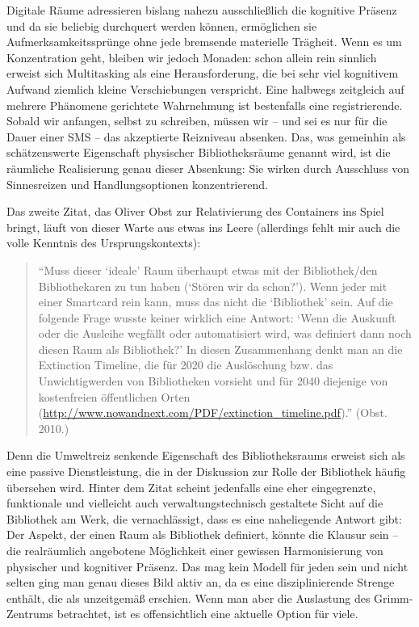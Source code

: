 \documentclass[output=paper]{langscibook}
\begin{document}
Digitale Räume adressieren bislang nahezu ausschließlich die kognitive
Präsenz und da sie beliebig durchquert werden können, ermöglichen sie
Aufmerksamkeitssprünge ohne jede bremsende materielle Trägheit. Wenn es
um Konzentration geht, bleiben wir jedoch Monaden: schon allein rein
sinnlich erweist sich Multitasking als eine Herausforderung, die bei
sehr viel kognitivem Aufwand ziemlich kleine Verschiebungen verspricht.
Eine halbwegs zeitgleich auf mehrere Phänomene gerichtete Wahrnehmung
ist bestenfalls eine registrierende. Sobald wir anfangen, selbst zu
schreiben, müssen wir -- und sei es nur für die Dauer einer SMS -- das
akzeptierte Reizniveau absenken. Das, was gemeinhin als schätzenswerte
Eigenschaft physischer Bibliotheksräume genannt wird, ist die räumliche
Realisierung genau dieser Absenkung: Sie wirken durch Ausschluss von
Sinnesreizen und Handlungsoptionen konzentrierend.

Das zweite Zitat, das Oliver Obst zur Relativierung des Containers ins
Spiel bringt, läuft von dieser Warte aus etwas ins Leere (allerdings
fehlt mir auch die volle Kenntnis des Ursprungskontexts):

\begin{quote}
\enquote{Muss dieser \enquote{ideale} Raum überhaupt etwas mit der Bibliothek/den
Bibliothekaren zu tun haben (\enquote{Stören wir da schon?}). Wenn jeder
mit einer Smartcard rein kann, muss das nicht die \enquote{Bibliothek}
sein. Auf die folgende Frage wusste keiner wirklich eine Antwort:
\enquote{Wenn die Auskunft oder die Ausleihe wegfällt oder automatisiert
wird, was definiert dann noch diesen Raum als Bibliothek?} In diesen
Zusammenhang denkt man an die
Extinction
Timeline, die für 2020 die Auslöschung bzw. das Unwichtigwerden von
Bibliotheken vorsieht und für 2040 diejenige von kostenfreien
öffentlichen Orten (\url{http://www.nowandnext.com/PDF/extinction_timeline.pdf}).} (Obst. 2010.)
\end{quote}

Denn die Umweltreiz senkende Eigenschaft des Bibliotheksraums erweist
sich als eine passive Dienstleistung, die in der Diskussion zur Rolle
der Bibliothek häufig übersehen wird. Hinter dem Zitat scheint
jedenfalls eine eher eingegrenzte, funktionale und vielleicht auch
verwaltungstechnisch gestaltete Sicht auf die Bibliothek am Werk, die
vernachlässigt, dass es eine naheliegende Antwort gibt: Der Aspekt, der
einen Raum als Bibliothek definiert, könnte die Klausur sein -- die
realräumlich angebotene Möglichkeit einer gewissen Harmonisierung von
physischer und kognitiver Präsenz. Das mag kein Modell für jeden sein
und nicht selten ging man genau dieses Bild aktiv an, da es eine
disziplinierende Strenge enthält, die als unzeitgemäß erschien. Wenn man
aber die Auslastung des Grimm-Zentrums betrachtet, ist es offensichtlich
eine aktuelle Option für viele.
\end{document}
